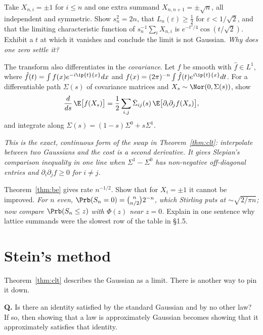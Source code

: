 \documentclass[11pt]{article}
\begin{document}
\begin{exercise}[\ty{C}]
Take $X_{n,i}=\pm1$ for $i\le n$ and one extra summand $X_{n,n+1}=\pm\sqrt n$, all independent and symmetric. Show $s_n^2=2n$, that $L_n(\varepsilon)\ge\tfrac12$ for $\varepsilon<1/\sqrt2$, and that the limiting characteristic function of $s_n^{-1}\sum_iX_{n,i}$ is $e^{-t^2/4}\cos(t/\sqrt2)$. Exhibit a $t$ at which it vanishes and conclude the limit is not Gaussian. \emph{Why does one zero settle it?}
\end{exercise}

\begin{exercise}[\ty{C}]
The transform also differentiates in the \emph{covariance}. Let $f$ be smooth with $\hat f\in L^1$, where $\hat f(t)=\int f(x)e^{-i\ip{t}{x}}dx$ and $f(x)=(2\pi)^{-n}\int\hat f(t)e^{i\ip{t}{x}}dt$. For a differentiable path $\Sigma(s)$ of covariance matrices and $X_s\sim\Nor(0,\Sigma(s))$, show
\[
\frac{d}{ds}\,\E\big[f(X_s)\big]=\frac12\sum_{i,j}\dot\Sigma_{ij}(s)\,\E\big[\partial_i\partial_jf(X_s)\big],
\]
and integrate along $\Sigma(s)=(1-s)\Sigma^0+s\Sigma^1$.

\emph{This is the exact, continuous form of the swap in Theorem~\ref{thm:clt}: interpolate between two Gaussians and the cost is a second derivative. It gives Slepian's comparison inequality in one line when $\Sigma^1-\Sigma^0$ has non-negative off-diagonal entries and $\partial_i\partial_jf\ge0$ for $i\ne j$.}
\end{exercise}

\begin{exercise}[\ty{C}]
Theorem~\ref{thm:be} gives rate $n^{-1/2}$. Show that for $X_i=\pm1$ it cannot be improved. \emph{For $n$ even, $\Prb(S_n=0)=\binom{n}{n/2}2^{-n}$, which Stirling puts at $\sim\sqrt{2/\pi n}$; now compare $\Prb(S_n\le z)$ with $\Phi(z)$ near $z=0$.} Explain in one sentence why lattice summands were the slowest row of the table in \S1.5.
\end{exercise}

\section{Stein's method}

Theorem~\ref{thm:clt} describes the Gaussian as a limit. There is another way to pin it down.

\begin{question}
\textbf{Q.} Is there an identity satisfied by the standard Gaussian and by no other law?\\[0.25em]
If so, then showing that a law is approximately Gaussian becomes showing that it approximately satisfies that identity.
\end{question}
\end{document}

